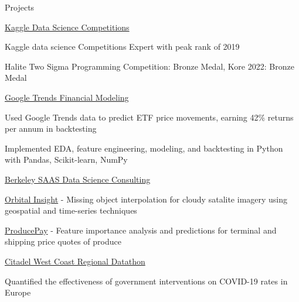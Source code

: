 \documentclass{resume} %
\begin{document}
\begin{rSection}{Projects}

\begin{rSubsection}{\href{https://www.kaggle.com/evilpegasus}{Kaggle Data Science Competitions}}{}{}{}
    \item Kaggle data science Competitions Expert with peak rank of 2019
    \item Halite Two Sigma Programming Competition: Bronze Medal, Kore 2022: Bronze Medal
\end{rSubsection}

\begin{rSubsection}{\href{https://github.com/evilpegasus/google-trends-financial-modeling/}{Google Trends Financial Modeling}}{}{}{}
    \item Used Google Trends data to predict ETF price movements, earning 42\% returns per annum in backtesting
    \item Implemented EDA, feature engineering, modeling, and backtesting in Python with Pandas, Scikit-learn, NumPy
\end{rSubsection}

\begin{rSubsection}{\href{https://www.producepay.com/}{Berkeley SAAS Data Science Consulting}}{}{}{}
    \item \href{https://orbitalinsight.com/}{Orbital Insight} - Missing object interpolation for cloudy satalite imagery using geospatial and time-series techniques
    \item \href{https://producepay.com/}{ProducePay} - Feature importance analysis and predictions for terminal and shipping price quotes of produce
\end{rSubsection}


\begin{rSubsection}{\href{https://github.com/evilpegasus/datathon-spring-2021}{Citadel West Coast Regional Datathon}}{}{}{}
    \item Quantified the effectiveness of government interventions on COVID-19 rates in Europe
\end{rSubsection}


\end{rSection}
\end{document}
